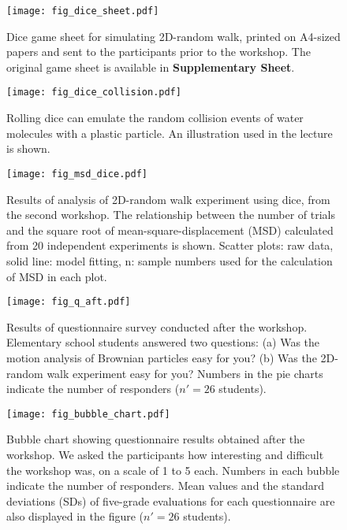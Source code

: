 \documentclass[10pt, aps, prb, preprint, longbibliography, superscriptaddress]{revtex4-2}
\begin{document}
\clearpage

\begin{figure}
	\texttt{[image: fig\_dice\_sheet.pdf]}
	\caption{Dice game sheet for simulating 2D-random walk,
	printed on A4-sized papers and sent to the participants prior to the workshop.
	The original game sheet is available in \textbf{Supplementary Sheet}.}
	\label{fig_dice_sheet}
\end{figure}

\clearpage


\begin{figure}
	\texttt{[image: fig\_dice\_collision.pdf]}
	\caption{Rolling dice can emulate the random collision events of water molecules with a plastic particle.
	An illustration used in the lecture is shown.}
	\label{fig_dice_collision}
\end{figure}

\clearpage


\begin{figure}
	\texttt{[image: fig\_msd\_dice.pdf]}
	\caption{Results of analysis of 2D-random walk experiment using dice, from the second workshop.
	The relationship between the number of trials and the square root of mean-square-displacement (MSD)
	calculated from 20 independent experiments is shown.
	Scatter plots: raw data, solid line: model fitting, n: sample numbers used for the calculation of MSD in each plot.}
	\label{fig_msd_dice}
\end{figure}


\clearpage

\begin{figure}
	\texttt{[image: fig\_q\_aft.pdf]}
	\caption{Results of questionnaire survey conducted after the workshop.
	Elementary school students answered two questions:
	(a) Was the motion analysis of Brownian particles easy for you?
	(b) Was the 2D-random walk experiment easy for you?
	Numbers in the pie charts indicate the number of responders ($n' = 26$ students).}
	\label{fig_q_aft}
\end{figure}


\clearpage

\begin{figure}
	\texttt{[image: fig\_bubble\_chart.pdf]}
	\caption{Bubble chart showing questionnaire results obtained after the workshop.
	We asked the participants how interesting and difficult the workshop was, on a scale of 1 to 5 each.
	Numbers in each bubble indicate the number of responders.
	Mean values and the standard deviations (SDs) of five-grade evaluations
	for each questionnaire are also displayed in the figure ($n' = 26$ students).}
	\label{fig_bubble_chart}
\end{figure}
\end{document}
